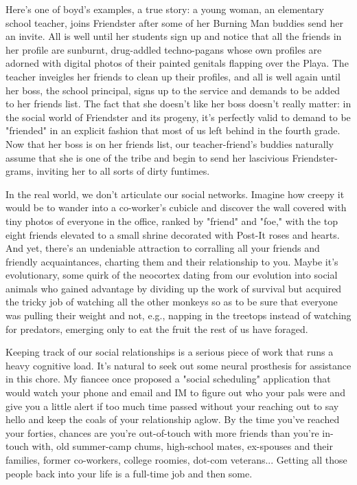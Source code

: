 Here's one of boyd's examples, a true story: a young woman, an
elementary school teacher, joins Friendster after some of her
Burning Man buddies send her an invite. All is well until her
students sign up and notice that all the friends in her profile are
sunburnt, drug-addled techno-pagans whose own profiles are adorned
with digital photos of their painted genitals flapping over the
Playa. The teacher inveigles her friends to clean up their
profiles, and all is well again until her boss, the school
principal, signs up to the service and demands to be added to her
friends list. The fact that she doesn't like her boss doesn't
really matter: in the social world of Friendster and its progeny,
it's perfectly valid to demand to be "friended" in an explicit
fashion that most of us left behind in the fourth grade. Now that
her boss is on her friends list, our teacher-friend's buddies
naturally assume that she is one of the tribe and begin to send her
lascivious Friendster-grams, inviting her to all sorts of dirty
funtimes.

In the real world, we don't articulate our social networks. Imagine
how creepy it would be to wander into a co-worker's cubicle and
discover the wall covered with tiny photos of everyone in the
office, ranked by "friend" and "foe," with the top eight friends
elevated to a small shrine decorated with Post-It roses and hearts.
And yet, there's an undeniable attraction to corralling all your
friends and friendly acquaintances, charting them and their
relationship to you. Maybe it's evolutionary, some quirk of the
neocortex dating from our evolution into social animals who gained
advantage by dividing up the work of survival but acquired the
tricky job of watching all the other monkeys so as to be sure that
everyone was pulling their weight and not, e.g., napping in the
treetops instead of watching for predators, emerging only to eat
the fruit the rest of us have foraged.

Keeping track of our social relationships is a serious piece of
work that runs a heavy cognitive load. It's natural to seek out
some neural prosthesis for assistance in this chore. My fiancee
once proposed a "social scheduling" application that would watch
your phone and email and IM to figure out who your pals were and
give you a little alert if too much time passed without your
reaching out to say hello and keep the coals of your relationship
aglow. By the time you've reached your forties, chances are you're
out-of-touch with more friends than you're in-touch with, old
summer-camp chums, high-school mates, ex-spouses and their
families, former co-workers, college roomies, dot-com veterans...
Getting all those people back into your life is a full-time job and
then some.

